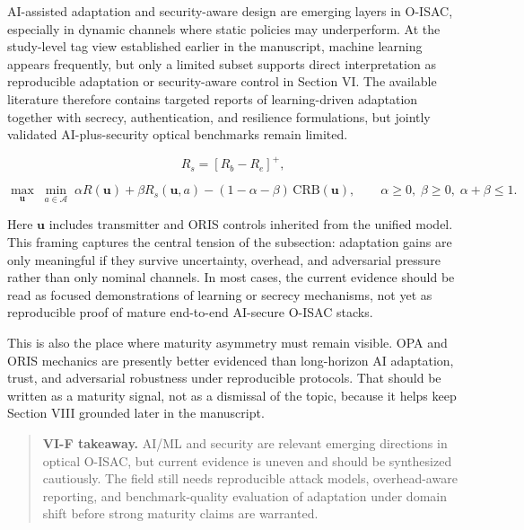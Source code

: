 AI-assisted adaptation and security-aware design are emerging layers in O-ISAC, especially in dynamic channels where static policies may underperform. At the study-level tag view established earlier in the manuscript, machine learning appears frequently, but only a limited subset supports direct interpretation as reproducible adaptation or security-aware control in Section VI. The available literature therefore contains targeted reports of learning-driven adaptation together with secrecy, authentication, and resilience formulations, but jointly validated AI-plus-security optical benchmarks remain limited.

\begin{equation}
\label{eq:enablers-secrecy}
R_s=[R_b-R_e]^+,
\end{equation}

\begin{equation}
\label{eq:enablers-robust-ai}
\max_{\mathbf{u}}\;\min_{a\in\mathcal A}\;\alpha R(\mathbf{u})+\beta R_s(\mathbf{u},a)-(1-\alpha-\beta)\,\mathrm{CRB}(\mathbf{u}),
\qquad
\alpha\ge 0,\;\beta\ge 0,\;\alpha+\beta\le 1.
\end{equation}

Here $\mathbf{u}$ includes transmitter and ORIS controls inherited from the unified model. This framing captures the central tension of the subsection: adaptation gains are only meaningful if they survive uncertainty, overhead, and adversarial pressure rather than only nominal channels. In most cases, the current evidence should be read as focused demonstrations of learning or secrecy mechanisms, not yet as reproducible proof of mature end-to-end AI-secure O-ISAC stacks.

This is also the place where maturity asymmetry must remain visible. OPA and ORIS mechanics are presently better evidenced than long-horizon AI adaptation, trust, and adversarial robustness under reproducible protocols. That should be written as a maturity signal, not as a dismissal of the topic, because it helps keep Section VIII grounded later in the manuscript.

\begin{quote}
\textbf{VI-F takeaway.} AI/ML and security are relevant emerging directions in optical O-ISAC, but current evidence is uneven and should be synthesized cautiously. The field still needs reproducible attack models, overhead-aware reporting, and benchmark-quality evaluation of adaptation under domain shift before strong maturity claims are warranted.
\end{quote}

